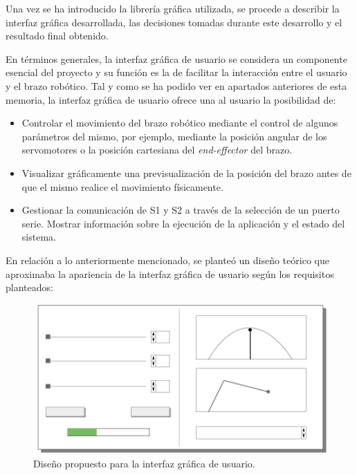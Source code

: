 Una vez se ha introducido la librería gráfica utilizada, se procede a describir la interfaz gráfica desarrollada, las decisiones tomadas durante este desarrollo y el resultado final obtenido.

En términos generales, la interfaz gráfica de usuario se considera un componente esencial del proyecto y su función es la de facilitar la interacción entre el usuario y el brazo robótico. Tal y como se ha podido ver en apartados anteriores de esta memoria, la interfaz gráfica de usuario ofrece una al usuario la posibilidad de:
\begin{itemize}
    \item Controlar el movimiento del brazo robótico mediante el control de algunos parámetros del mismo, por ejemplo, mediante la posición angular de los servomotores o la posición cartesiana del \textit{end-effector} del brazo.
    \item Visualizar gráficamente una previsualización de la posición del brazo antes de que el mismo realice el movimiento físicamente.
    \item Gestionar la comunicación de \ac{S1} y \ac{S2} a través de la selección de un puerto serie.
    \iteem Mostrar información sobre la ejecución de la aplicación y el estado del sistema.
\end{itemize}

En relación a lo anteriormente mencionado, se planteó un diseño teórico que aproximaba la apariencia de la interfaz gráfica de usuario según los requisitos planteados:

\begin{figure}[H]
    \centering
    \includegraphics[width=0.6\linewidth]{RS/images/InterfaceSketch-MkII.png}
    \caption{Diseño propuesto para la interfaz gráfica de usuario.}
    \label{fig:ui_design}
\end{figure}

